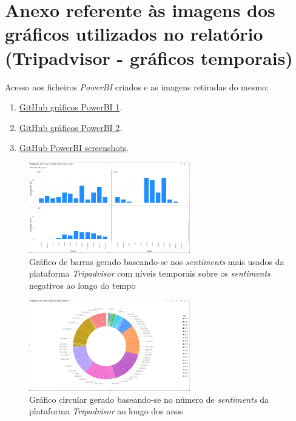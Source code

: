 \chapter{Anexo referente às imagens dos gráficos utilizados no relatório (Tripadvisor - gráficos temporais)}

Acesso aos ficheiros \textit{PowerBI} criados e as imagens retiradas do mesmo:

\begin{enumerate}
    \item \href{https://github.com/CatKinKitKat/pi2021/blob/master/projecto/sql/Graphs.pbix}{GitHub gráficos PowerBI 1}.
    \item \href{https://github.com/CatKinKitKat/pi2021/blob/master/projecto/sql/qq.pbix}{GitHub gráficos PowerBI 2}.
    \item \href{https://github.com/CatKinKitKat/pi2021/tree/master/projecto/sql/screenshotsPowerBI}{GitHub PowerBI screenshots}.
\end{enumerate}

\label{an1}
\begin{figure}[!htb]
\centering
\includegraphics[width=7cm]{figuras/NegPerYear/4.PNG}
\caption{Gráfico de barras gerado baseando-se nos \textit{sentiments} mais usados da plataforma \textit{Tripadvisor} com níveis temporais sobre os \textit{sentiments} negativos ao longo do tempo}
\label{fig:exemplofig}
\end{figure}

\begin{figure}[!htb]
\centering
\includegraphics[width=7cm]{figuras/NrReviewsPerYear/CircleGraph.PNG}
\caption{Gráfico circular gerado baseando-se no número de \textit{sentiments} da plataforma \textit{Tripadvisor} ao longo dos anos}
\label{fig:exemplofig}
\end{figure}

